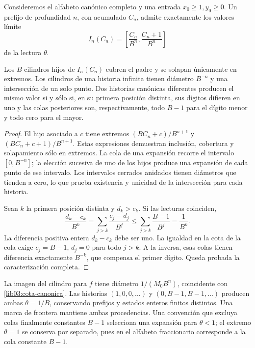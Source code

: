 Consideremos el alfabeto canónico completo y una entrada
\(x_0\geq1,y_0\geq0\). Un prefijo de profundidad \(n\), con
acumulado \(C_n\), admite exactamente los valores límite
\begin{equation}
 I_n(C_n)=\left[\frac{C_n}{B^n},\frac{C_n+1}{B^n}\right]
 \label{lib03:cilindro}
\end{equation}
de la lectura \(\theta\).

\begin{theorem}
\label{lib03:teo-cilindros}
Los \(B\) cilindros hijos de \(I_n(C_n)\) cubren el padre y se
solapan únicamente en extremos. Los cilindros de una historia infinita
tienen diámetro \(B^{-n}\) y una intersección de un solo punto.
Dos historias canónicas diferentes producen el mismo valor si y sólo
si, en su primera posición distinta, sus dígitos difieren en uno y las
colas posteriores son, respectivamente, todo \(B-1\) para el dígito
menor y todo cero para el mayor.
\end{theorem}

\begin{proof}
El hijo asociado a \(c\) tiene extremos
\((BC_n+c)/B^{n+1}\) y \((BC_n+c+1)/B^{n+1}\).
Estas expresiones demuestran inclusión, cobertura y solapamiento sólo
en extremos. La cola de una expansión recorre el intervalo
\([0,B^{-n}]\); la elección sucesiva de uno de los hijos produce una
expansión de cada punto de ese intervalo. Los intervalos cerrados
anidados tienen diámetros que tienden a cero, lo que prueba existencia
y unicidad de la intersección para cada historia.

Sean \(k\) la primera posición distinta y \(d_k>c_k\). Si las
lecturas coinciden,
\[
 \frac{d_k-c_k}{B^k}
 =\sum_{j>k}\frac{c_j-d_j}{B^j}
 \leq\sum_{j>k}\frac{B-1}{B^j}=\frac1{B^k}.
\]
La diferencia positiva entera \(d_k-c_k\) debe ser uno. La igualdad
en la cota de la cola exige \(c_j=B-1\), \(d_j=0\) para todo
\(j>k\). A la inversa, esas colas tienen diferencia exactamente
\(B^{-k}\), que compensa el primer dígito. Queda probada la
caracterización completa.
\end{proof}

La imagen del cilindro para \(f\) tiene diámetro
\(1/(M_0B^n)\), coincidente con \eqref{lib03:cota-canonica}.
Las historias \((1,0,0,\ldots)\) y
\((0,B-1,B-1,\ldots)\) producen ambas \(\theta=1/B\), conservando
prefijos y estados enteros finitos distintos. Una marca de frontera
mantiene ambas procedencias. Una convención que excluya colas finalmente
constantes \(B-1\) selecciona una expansión para \(\theta<1\);
el extremo \(\theta=1\) se conserva por separado, pues en el
alfabeto fraccionario corresponde a la cola constante \(B-1\).

